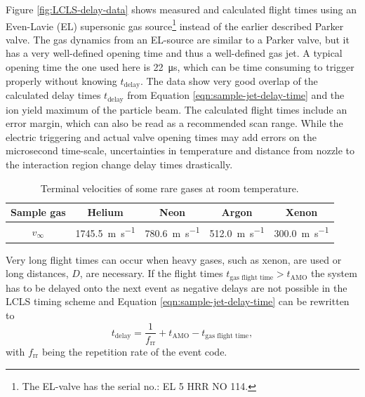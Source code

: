 Figure \ref{fig:LCLS-delay-data} shows measured and calculated flight times using an Even-Lavie (EL) supersonic gas source\footnote{The EL-valve has the serial no.: EL 5 HRR NO 114.} instead of the earlier described Parker valve. The gas dynamics from an EL-source are similar to a Parker valve, but it has a very well-defined opening time and thus a well-defined gas jet. A typical opening time the one used here is \SI{22}{\micro\second}, which can be time consuming to trigger properly without knowing $t_{\text{delay}}$. The data show very good overlap of the calculated delay times $t_{\text{delay}}$ from Equation \ref{eqn:sample-jet-delay-time} and the ion yield maximum of the particle beam. The calculated flight times include an error margin, which can also be read as a recommended scan range. While the electric triggering and actual valve opening times may add errors on the microsecond time-scale, uncertainties in temperature and distance from nozzle to the interaction region change delay times drastically.\\[1\baselineskip]
%
\begin{table}
\centering
\begin{tabular}{ | c | c | c | c | c | }
\hline
	\textbf{Sample gas} & \textbf{Helium} & \textbf{Neon} & \textbf{Argon} & \textbf{Xenon} \\ \hline
	$v_{\infty}$ & \SI{1745.5}{\meter\per\second} & \SI{780.6}{\meter\per\second} & \SI{512.0}{\meter\per\second} & \SI{300.0}{\meter\per\second} \\ \hline
\end{tabular}
\caption{Terminal velocities of some rare gases at room temperature.}
\label{tab:terminal-velocities}
\end{table}
%
Very long flight times can occur when heavy gases, such as xenon, are used or long distances, $D$, are necessary. If the flight times $t_{\text{gas flight time}} > t_{\text{AMO}}$ the system has to be delayed onto the next event as negative delays are not possible in the LCLS timing scheme and Equation \eqref{eqn:sample-jet-delay-time} can be rewritten to
\begin{equation}
t_{\text{delay}} = \frac{1}{f_{\text{rr}}} + t_{\text{AMO}} - t_{\text{gas flight time}},
\label{eqn:sample-jet-delay-time-next}
\end{equation}
with $f_{\text{rr}}$ being the repetition rate of the event code.
%
%
%
